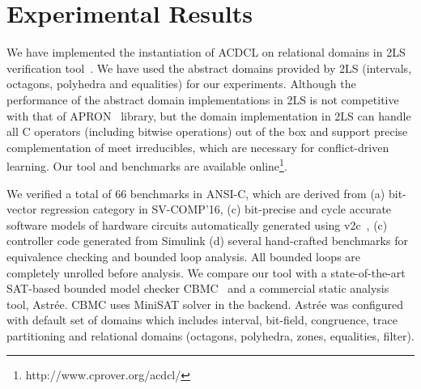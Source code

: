 \section{Experimental Results}
We have implemented the instantiation of ACDCL on relational domains
in 2LS verification tool~\cite{2ls}.  We have used the abstract domains
provided by 2LS (intervals, octagons, polyhedra and equalities) for our
experiments. Although the performance of the abstract domain implementations 
in 2LS is not competitive with that of APRON~\cite{apron} library, but 
the domain implementation in 2LS can handle all C operators 
(including bitwise operations) out of the box and support precise
complementation of meet irreducibles, which are necessary for conflict-driven 
learning. Our tool and benchmarks are available online\footnote{http://www.cprover.org/acdcl/}.

We verified a total of 66 benchmarks in ANSI-C, which are derived from 
(a) bit-vector regression category in SV-COMP'16, (c) bit-precise and 
cycle accurate software models of hardware circuits automatically 
generated using v2c~\cite{mtk2016}, (c) controller code generated 
from Simulink (d) several hand-crafted benchmarks for equivalence 
checking and bounded loop analysis.  All bounded loops are completely 
unrolled before analysis.  We compare our tool with a state-of-the-art 
SAT-based bounded model checker CBMC~\cite{cbmc} and a commercial 
static analysis tool, Astr{\'e}e.  CBMC uses MiniSAT solver in the backend.  
Astr{\'e}e was configured with default set of domains which includes 
interval, bit-field, congruence, trace partitioning and relational 
domains (octagons, polyhedra, zones, equalities, filter).   

